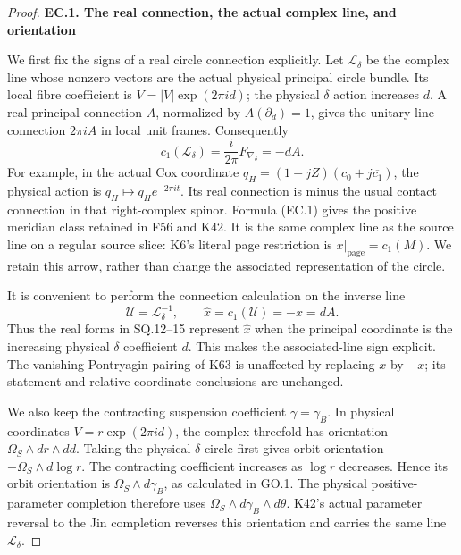 \begin{proof}
\par

\medskip\noindent\textbf{EC.1. The real connection, the actual complex line, and orientation}

\par\nobreak

We first fix the signs of a real circle connection explicitly. Let
\(\mathcal L_\delta\) be the complex line whose nonzero vectors are the
actual physical principal circle bundle. Its local fibre coefficient
is \(V=|V|\exp(2\pi i d)\); the physical \(\delta\) action increases \(d\).
A real principal connection \(A\), normalized by
\(A(\partial_d)=1\), gives the unitary line connection \(2\pi i A\)
in local unit frames. Consequently
\[
 c_1(\mathcal L_\delta)
       =\frac{i}{2\pi}F_{\nabla_\delta}=-dA.
                                                        \tag{EC.1}
\]
For example, in the actual Cox coordinate
\(q_H=(1+jZ)(c_0+j\overline{c_1})\), the physical action is
\(q_H\mapsto q_H e^{-2\pi i t}\). Its real connection is minus the
usual contact connection in that right-complex spinor. Formula
(EC.1) gives the positive meridian class retained in F56 and K42.
It is the same complex line as the source line on a regular source
slice: K6's literal page restriction is
\(x|_{\mathrm{page}}=c_1(M)\). We retain this arrow, rather than change
the associated representation of the circle.

It is convenient to perform the connection calculation on the inverse
line
\[
 \mathcal U=\mathcal L_\delta^{-1},\qquad
 \widehat x=c_1(\mathcal U)=-x=dA.
                                                        \tag{EC.2}
\]
Thus the real forms in SQ.12--15 represent \(\widehat x\) when the
principal coordinate is the increasing physical \(\delta\) coefficient
\(d\). This makes the associated-line sign explicit. The vanishing
Pontryagin pairing of K63 is unaffected by replacing \(x\) by \(-x\);
its statement and relative-coordinate conclusions are unchanged.

We also keep the contracting suspension coefficient
\(\gamma=\gamma_B\). In physical coordinates
\(V=r\exp(2\pi i d)\), the complex threefold has orientation
\(\Omega_S\wedge dr\wedge dd\). Taking the physical \(\delta\) circle
first gives orbit orientation
\(-\Omega_S\wedge d\log r\). The contracting coefficient increases
as \(\log r\) decreases. Hence its orbit orientation is
\(\Omega_S\wedge d\gamma_B\), as calculated in GO.1. The physical
positive-parameter completion therefore uses
\(\Omega_S\wedge d\gamma_B\wedge d\theta\). K42's actual parameter
reversal to the Jin completion reverses this orientation and carries
the same line \(\mathcal L_\delta\).


\end{proof}
